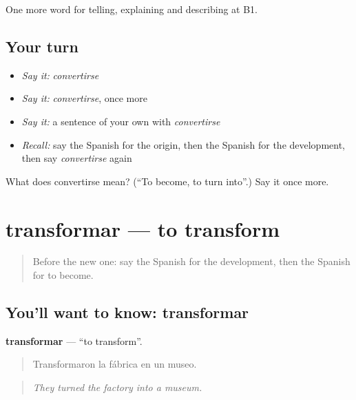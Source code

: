 \begin{grammarlens}[title={What you've built}]
One more word for telling, explaining and describing at B1.
\end{grammarlens}

\subsection*{Your turn}
\begin{itemize}
\raggedright
  \item \emph{Say it:} \emph{convertirse}
  \item \emph{Say it:} \emph{convertirse}, once more
  \item \emph{Say it:} a sentence of your own with \emph{convertirse}
  \item \emph{Recall:} say the Spanish for the origin, then the Spanish for the development, then say \emph{convertirse} again
\end{itemize}

\begin{tcolorbox}[breakable,colback=teal!4,colframe=teal!35!black,title={Before you move on}]
What does convertirse mean? (\textquotedblleft{}To become, to turn into\textquotedblright{}.) Say it once more.
\end{tcolorbox}
\section[transformar]{transformar — to transform}

\label{lesson:ES-C572-transformar}



\begin{quote}
Before the new one: say the Spanish for the development, then the Spanish for to become.
\end{quote}

\subsection*{You'll want to know: transformar}
\textbf{transformar} — \textquotedblleft{}to transform\textquotedblright{}.

\begin{quote}
Transformaron la fábrica en un museo.
\end{quote}

\begin{quote}
\emph{They turned the factory into a museum.}
\end{quote}

